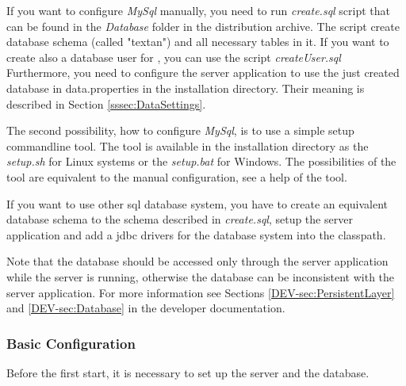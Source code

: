 If you want to configure \emph{MySql} manually, you need to run \emph{create.sql} script
that can be found in the \emph{Database} folder in the distribution archive. The script
create database schema (called "textan") and all necessary  tables in it. If you
want to create also a database user for \textan{}, you can use the script \emph{createUser.sql}
Furthermore, you need to configure the server application to use the just created
database in data.properties in the installation directory. Their meaning is described
in Section \ref{sssec:DataSettings}.

The second possibility, how to configure \emph{MySql}, is to use a simple setup
commandline tool. The tool is available in the installation directory as
the \emph{setup.sh} for Linux systems or the \emph{setup.bat} for Windows.
The possibilities of the tool are equivalent to the manual configuration, see
a help of the tool.

If you want to use other sql database system, you have to create an equivalent
database schema to the schema described in \emph{create.sql}, setup the server
application and add a jdbc drivers for the database system into the classpath.

Note that the database should be accessed only through the \textan{} server application
while the server is running, otherwise the database can be inconsistent with
the server application. For more information see Sections \ref{DEV-sec:PersistentLayer}
and \ref{DEV-sec:Database} in the developer documentation.

 

\subsubsection{Basic Configuration}

Before the first start, it is necessary to set up the server and the database.

